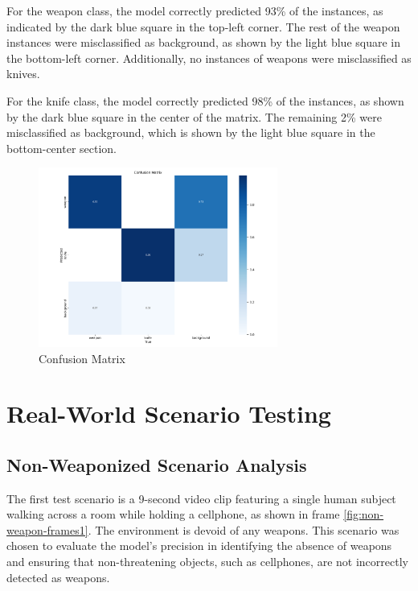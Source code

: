 For the weapon class, the model correctly predicted 93\% of the instances, as indicated by the dark blue 
square in the top-left corner. The rest of the weapon instances were misclassified as background, as
shown by the light blue square in the bottom-left corner. Additionally, no instances of weapons were 
misclassified as knives.


For the knife class, the model correctly predicted 98\% of the instances, as shown by the dark blue square 
in the center of the matrix. The remaining 2\% were misclassified as background, 
which is shown by the light blue square in the bottom-center section.

\begin{figure}[h]
    \centering 
    \includegraphics[width=0.7\textwidth]{figs/confusion_matrix.png} 
    \caption{Confusion Matrix}
    \label{fig:conf-matrix}
\end{figure}

\section{Real-World Scenario Testing}
\subsection{Non-Weaponized Scenario Analysis}
The first test scenario is a 9-second video clip featuring a single human subject walking across a room while holding a 
cellphone, as shown in frame \ref{fig:non-weapon-frames1}. The environment is devoid of any weapons. This 
scenario was chosen to evaluate the model's precision in identifying the absence of weapons and ensuring that 
non-threatening objects, such as cellphones, are not incorrectly detected as weapons.

